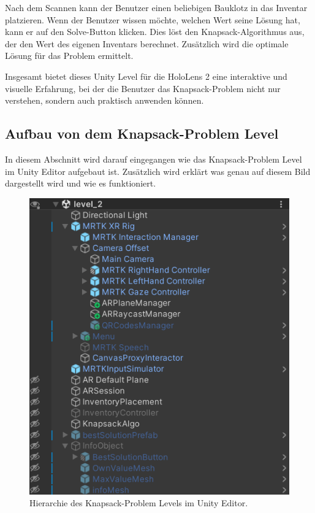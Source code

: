 Nach dem Scannen kann der Benutzer einen beliebigen Bauklotz in das Inventar platzieren.
Wenn der Benutzer wissen möchte, welchen Wert seine Lösung hat, kann er auf den Solve-Button
klicken. Dies löst den Knapsack-Algorithmus aus, der den Wert des eigenen Inventars berechnet.
Zusätzlich wird die optimale Lösung für das Problem ermittelt.

Insgesamt bietet dieses Unity Level für die HoloLens 2 eine interaktive und visuelle Erfahrung,
bei der die Benutzer das Knapsack-Problem nicht nur verstehen, sondern auch praktisch anwenden können.

\subsection{Aufbau von dem Knapsack-Problem Level}
In diesem Abschnitt wird darauf eingegangen wie das Knapsack-Problem Level im Unity Editor aufgebaut ist.
Zusätzlich wird erklärt was genau auf diesem Bild dargestellt wird und wie es funktioniert.\\

\begin{figure}[h]
    \centering
    \includegraphics[scale=0.8]{images/Level2Hirarchy}
    \caption{Hierarchie des Knapsack-Problem Levels im Unity Editor.}
    \label{fig:level2_hierarchy}
\end{figure}

